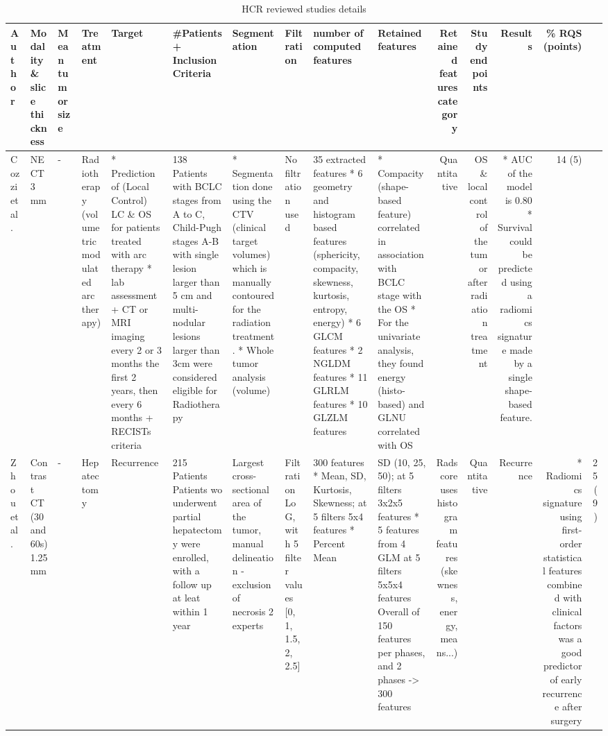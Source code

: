 \renewcommand{\arraystretch}{1}
\begin{landscape}
\begin{table}[!htp]\centering

\caption{HCR reviewed studies details}\label{tab:HCR_studies_details2}
\tiny

\begin{tabular}{lp{1.5cm}p{1.5cm}p{2cm}p{2.5cm}p{3cm}p{3cm}p{2cm}p{3cm}p{2cm}rrrrr}\toprule
\textbf{Author} &\textbf{Modality \& slice thickness} &\textbf{Mean tumor size} &\textbf{Treatment} &\textbf{Target} &\textbf{\#Patients + Inclusion Criteria} &\textbf{Segmentation} &\textbf{Filtration} &\textbf{number of computed features} &\textbf{Retained features} &\textbf{Retained features category} &\textbf{Study endpoints} &\textbf{Results} &\textbf{\% RQS (points)} \\\midrule
Cozzi et al. &NECT 3 mm &- &Radiotherapy (volumetric modulated arc therapy) &* Prediction of (Local Control) LC \& OS for patients treated with arc therapy * lab assessment + CT or MRI imaging every 2 or 3 months the first 2 years, then every 6 months + RECISTs criteria &138 Patients with BCLC stages from A to C, Child-Pugh stages A-B with single lesion larger than 5 cm and multi-nodular lesions larger than 3cm were considered eligible for Radiotherapy &* Segmentation done using the CTV (clinical target volumes) which is manually contoured for the radiation treatment. * Whole tumor analysis (volume) &No filtration used &35 extracted features * 6 geometry and histogram based features (sphericity, compacity, skewness, kurtosis, entropy, energy) * 6 GLCM features * 2 NGLDM features * 11 GLRLM features * 10 GLZLM features &* Compacity (shape-based feature) correlated in association with BCLC stage with the OS * For the univariate analysis, they found energy (histo-based) and GLNU correlated with OS &Quantitative &OS \& local control of the tumor after radiation treatment &* AUC of the model is 0.80 * Survival could be predicted using a radiomics signature made by a single shape-based feature. &14 (5) \\
Zhou et al. &Contrast CT (30 and 60s) 1.25 mm &- &Hepatectomy &Recurrence &215 Patients Patients wo underwent partial hepatectomy were enrolled, with a follow up at leat within 1 year &Largest cross-sectional area of the tumor, manual delineation - exclusion of necrosis 2 experts &Filtration LoG, with 5 filter values [0, 1, 1.5, 2, 2.5] &300 features * Mean, SD, Kurtosis, Skewness; at 5 filters 5x4 features * Percent Mean & SD (10, 25, 50); at 5 filters 3x2x5 features * 5 features from 4 GLM at 5 filters 5x5x4 features Overall of 150 features per phases, and 2 phases -> 300 features &Radscore uses histogram features (skewness, energy, means...) &Quantitative &Recurrence &* Radiomics signature using first-order statistical features combined with clinical factors was a good predictor of early recurrence after surgery &25 (9) \\

\end{tabular}
\end{table}
\end{landscape}
